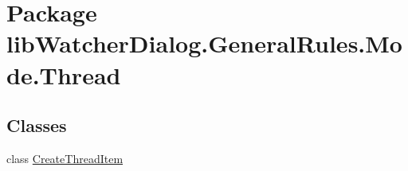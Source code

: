 \hypertarget{namespacelib_watcher_dialog_1_1_general_rules_1_1_mode_1_1_thread}{\section{Package lib\+Watcher\+Dialog.\+General\+Rules.\+Mode.\+Thread}
\label{namespacelib_watcher_dialog_1_1_general_rules_1_1_mode_1_1_thread}
}
\subsection*{Classes}
\begin{DoxyCompactItemize}
\item 
class \hyperlink{classlib_watcher_dialog_1_1_general_rules_1_1_mode_1_1_thread_1_1_create_thread_item}{Create\+Thread\+Item}
\end{DoxyCompactItemize}
